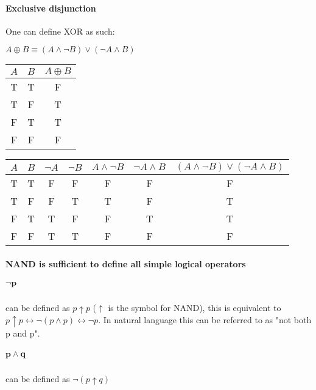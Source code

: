 \documentclass[11pt]{article}
\begin{document}
\paragraph*{Exclusive disjunction}
One can define XOR as such:
\begin{center}
    \(A \oplus B \equiv (A \wedge \neg B)\vee(\neg A \wedge B)\)
\end{center}
\begin{center}
    \begin{tabular}{|c|c|c|}
        \hline
        \(A\) & \(B\) & \(A \oplus B\) \\
        \hline
        T & T & F \\
        T & F & T \\
        F & T & T \\
        F & F & F \\
        \hline
    \end{tabular}
    \begin{tabular}{|c|c|c|c|c|c|c|}
        \hline
        \(A\) & \(B\) & \(\neg A\) & \(\neg B\) & \(A \wedge \neg B\) & \(\neg A \wedge B\) & \((A \wedge \neg B)\vee(\neg A \wedge B)\) \\
        \hline
        T & T & F & F & F & F & F \\
        T & F & F & T & T & F & T \\
        F & T & T & F & F & T & T \\
        F & F & T & T & F & F & F \\
        \hline
    \end{tabular}
\end{center}
\paragraph*{NAND is sufficient to define all simple logical operators}
\subparagraph*{\(\bm{\neg p}\)}
can be defined as \(p \uparrow p\) (\(\uparrow\) is the symbol for NAND), this is equivalent to \(p \uparrow p \leftrightarrow \neg(p \wedge p) \leftrightarrow \neg p\). In natural language this can be referred to as "not both p and p".
\subparagraph*{\(\bm{p \wedge q}\)}
can be defined as \(\neg(p \uparrow q)\)
\end{document}
